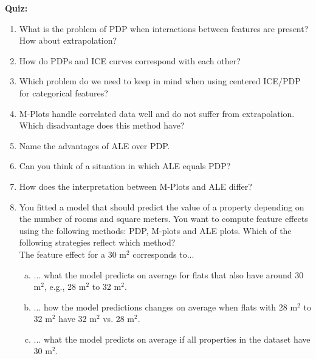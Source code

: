 \textbf{Quiz:}
\begin{enumerate}
        
        \item What is the problem of PDP when interactions between features are present? How about extrapolation?
        \item How do PDPs and ICE curves correspond with each other?
        \item Which problem do we need to keep in mind when using centered ICE/PDP for categorical features? 
        \item M-Plots handle correlated data well and do not suffer from extrapolation. Which disadvantage does this method have?
        \item Name the advantages of ALE over PDP.
        \item Can you think of a situation in which ALE equals PDP?
        \item How does the interpretation between M-Plots and ALE differ?


\item You fitted a model that should predict the value of a property depending on 
    the number of rooms and square meters. 
    You want to compute feature effects using the following methods: 
    PDP, M-plots and ALE plots. 
    Which of the following strategies reflect which method? \\
    The feature effect for a 30 m$^2$ corresponds to... 
\begin{enumerate}[a)]
  \item ... what the model predicts on average for flats that also have around 30 m$^2$, e.g., 28 m$^2$ to 32 m$^2$. 
  \item ... how the model predictions changes on average when flats with 28 m$^2$ to 32 m$^2$ have 32 m$^2$ vs. 28 m$^2$. 
  \item ... what the model predicts on average if all properties in the dataset have 30 m$^2$. 
\end{enumerate}

\end{enumerate}